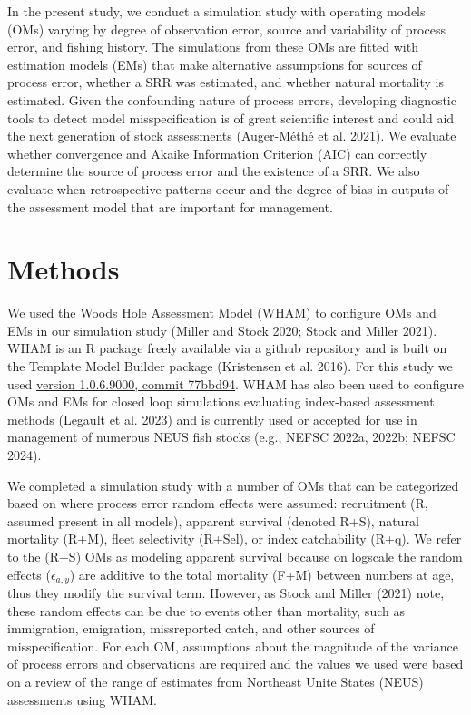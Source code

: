 \documentclass[
  12pt,
]{article}
\begin{document}
In the present study, we conduct a simulation study with operating
models (OMs) varying by degree of observation error, source and
variability of process error, and fishing history. The simulations from
these OMs are fitted with estimation models (EMs) that make alternative
assumptions for sources of process error, whether a SRR was estimated,
and whether natural mortality is estimated. Given the confounding nature
of process errors, developing diagnostic tools to detect model
misspecification is of great scientific interest and could aid the next
generation of stock assessments ({Auger-Méthé et al.} 2021). We evaluate
whether convergence and Akaike Information Criterion (AIC) can correctly
determine the source of process error and the existence of a SRR. We
also evaluate when retrospective patterns occur and the degree of bias
in outputs of the assessment model that are important for management.

\section*{Methods}\label{methods}

We used the Woods Hole Assessment Model (WHAM) to configure OMs and EMs
in our simulation study (Miller and Stock 2020; Stock and Miller 2021).
WHAM is an R package freely available via a github repository and is
built on the Template Model Builder package (Kristensen et al. 2016).
For this study we used
\href{https://github.com/timjmiller/wham/tree/77bbd946e4881216a439933473d1c58b21c270c3}{version
1.0.6.9000, commit 77bbd94}. WHAM has also been used to configure OMs
and EMs for closed loop simulations evaluating index-based assessment
methods (Legault et al. 2023) and is currently used or accepted for use
in management of numerous NEUS fish stocks (e.g., NEFSC 2022a, 2022b;
NEFSC 2024).

We completed a simulation study with a number of OMs that can be
categorized based on where process error random effects were assumed:
recruitment (R, assumed present in all models), apparent survival
(denoted R+S), natural mortality (R+M), fleet selectivity (R+Sel), or
index catchability (R+q). We refer to the (R+S) OMs as modeling apparent
survival because on logscale the random effects (\(\epsilon_{a,y}\)) are
additive to the total mortality (F+M) between numbers at age, thus they
modify the survival term. However, as Stock and Miller (2021) note,
these random effects can be due to events other than mortality, such as
immigration, emigration, missreported catch, and other sources of
misspecification. For each OM, assumptions about the magnitude of the
variance of process errors and observations are required and the values
we used were based on a review of the range of estimates from Northeast
Unite States (NEUS) assessments using WHAM.
\end{document}
